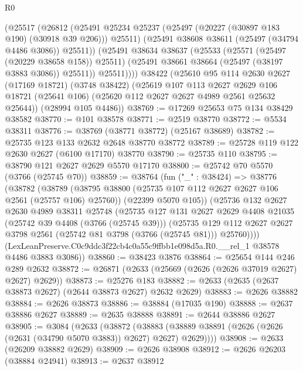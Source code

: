 \begin{lexlean}{R0}
\begin{coremodule}
        (@25517
          (@26812
            (@25491 @25234 @25237 (@25497 (@20227 (@30897 @183 @190) (@30918 @39 @206))) @25511)
            (@25491 @38608 @38611 (@25497 (@34794 @4486 @3086)) @25511))
          (@25491
            @38634
            @38637
            (@25533
              (@25571 (@25497 (@20229 @38658 @158)) @25511)
              (@25491 @38661 @38664 (@25497 (@38197 @3883 @3086)) @25511))
            @25511))))
    @38422
    (@25610
      @95
      @114
      @2630
      @2627
      (@17169 @18721)
      (@3748 @38422)
      (@25619
        @107
        @113
        @2627
        @2629
        @106
        @18721
        (@25641 @106)
        (@25620 @112 @2627 @2627 @4989 @2561 @25632 @25644))
      (@28994 @105 @4486))
@38769 := @17269 @25653 @75 @134 @38429 @38582
@38770 := @101 @38578
@38771 := @2519 @38770
@38772 := @5534 @38311
@38776 := @38769 (@38771 @38772) (@25167 @38689)
@38782 := @25735 @123 @133 @2632 @2648 @38770 @38772
@38789 := @25728 @119 @122 @2630 @2627 (@6100 @17170) @38770
@38790 := @25735 @110
@38795 := @38790 @121 @2627 @2629 @5570 @17170
@38800 := @25742 @70 @5570 (@3766 (@25745 @70))
@38859 := @38764
    (fun ("_" : @38424) =>
    @38776
      (@38782
        (@38789
          (@38795 @38800 (@25735 @107 @112 @2627 @2627 @106 @2561 (@25757 @106) @25760))
          (@22399 @5070 @105))
        (@25736
          @132
          @2627
          @2630
          @4989
          @38311
          @25748
          (@25735
            @127
            @131
            @2627
            @2629
            @4408
            @21035
            (@25742 @39 @4408 (@3766 (@25745 @39)))
            (@25735
              @129
              @112
              @2627
              @2627
              @3798
              @2561
              (@25742 @81 @3798 (@3766 (@25745 @81)))
              @25760))))
      (LexLeanPreserve.C0c9ddc3f22cb4c0a55c9ffbb1e098d5a.R0.__rel_1 @38578 @4486 @3883 @3086))
@38860 := @38423 @3876
@38864 := @25654 @144 @246 @289 @2632
@38872 := @26871 (@2633 (@25669 (@2626 (@2626 @37019 @2627) @2627) @2629))
@38873 := @25276 @183
@38882 := @2633 (@2635 (@2637 @38873 @2627) (@2644 @38873 @2627) @2632 @2629)
@38883 := @2626 @38882
@38884 := @2626 @38873
@38886 := @38884 (@17035 @190)
@38888 := @2637 @38886 @2627
@38889 := @2635 @38888
@38891 := @2644 @38886 @2627
@38905 := @3084
    (@2633
      (@38872
        (@38883 (@38889 @38891 (@2626 (@2626 (@2631 (@34790 @5070 @3883)) @2627) @2627) @2629))))
@38908 := @2633 (@26209 @38882 @2629)
@38909 := @2626 @38908
@38912 := @2626 @26203 (@38884 @24941)
@38913 := @2637 @38912

\end{coremodule}
\end{lexlean}

